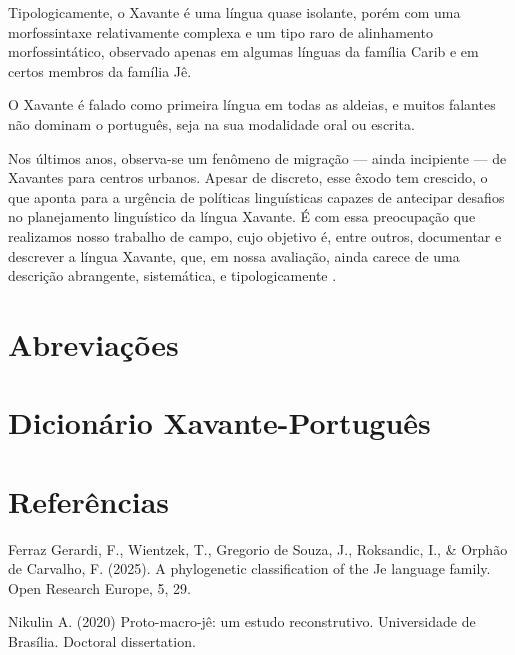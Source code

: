 \documentclass[12pt]{book}
\begin{document}
Tipologicamente, o Xavante é uma língua quase isolante, porém com uma morfossintaxe relativamente complexa e um tipo raro de alinhamento morfossintático, observado apenas em algumas línguas da família Carib e em certos membros da família Jê.

O Xavante é falado como primeira língua em todas as aldeias, e muitos falantes não dominam o português, seja na sua modalidade oral ou escrita.

Nos últimos anos, observa-se um fenômeno de migração — ainda incipiente — de Xavantes para centros urbanos. Apesar de discreto, esse êxodo tem crescido, o que aponta para a urgência de políticas linguísticas capazes de antecipar desafios no planejamento linguístico da língua Xavante. É com essa preocupação que realizamos nosso trabalho de campo, cujo objetivo é, entre outros, documentar e descrever a língua Xavante, que, em nossa avaliação, ainda carece de uma descrição abrangente,  sistemática, e tipologicamente .




\chapter*{Abreviações}


\frontmatter
\renewcommand{\contentsname}{Dicionário Xavante-Português} %
\tableofcontents

\mainmatter

\chapter*{Dicionário Xavante-Português}


\backmatter
\chapter*{Referências}

Ferraz Gerardi, F., Wientzek, T., Gregorio de Souza, J., Roksandic, I., \& Orphão de Carvalho, F. (2025). A phylogenetic classification of the Je language family. Open Research Europe, 5, 29.

Nikulin A. (2020) Proto-macro-jê: um estudo reconstrutivo. Universidade de Brasília. Doctoral dissertation.
\end{document}
